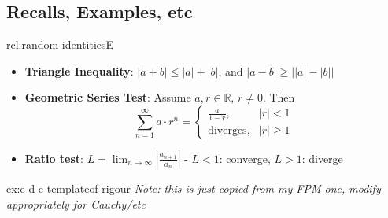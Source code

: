 \documentclass[landscape, 8pt]{extarticle}
\begin{document}
\begin{multicols}{3}
\newpage

\section{Recalls, Examples, etc}

\begin{rcl}{rcl:random-identities}{E}
	\begin{itemize}[leftmargin=*]
	    \setlength\itemsep{0em}
	    \item \textbf{Triangle Inequality}: $\lvert a + b \rvert \le \lvert a \rvert + \lvert b \rvert$, and $\lvert a - b \rvert \ge \lvert \lvert a \rvert - \lvert b \rvert \rvert$
	    \item \textbf{Geometric Series Test}: Assume $a, r\in \mathbb{R},\, r\ne 0$. Then
			\[\sum_{n = 1}^{\infty}a \cdot r^{n} = \begin{cases}
				\displaystyle\frac{a}{1 - r}, & \lvert r \rvert < 1 \\
				\text{diverges}, & \lvert r \rvert \ge 1
			\end{cases}\]
		\item \textbf{Ratio test}: $\displaystyle L = \lim_{n\to\infty} \left\lvert \frac{a_{n+1}}{a_{n}} \right\rvert$ - $L<1$: converge,  $L>1$: diverge
	\end{itemize}
\end{rcl}

\begin{xmp}{ex:e-d-c-template}{of rigour}
	\textit{Note: this is just copied from my FPM one, modify appropriately for Cauchy/etc}


\end{xmp}
\end{multicols}
\end{document}
